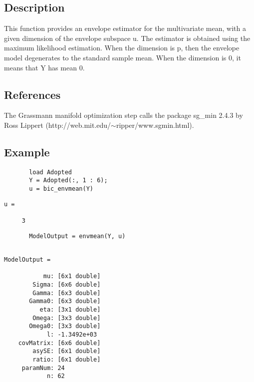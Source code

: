 \documentclass[a4paper,11pt,openany]{memoir}
\begin{document}
\subsection*{Description}

\begin{par}
This function provides an envelope estimator for the multivariate mean, with a given dimension of the envelope subspace u. The estimator is obtained using the maximum likelihood estimation.  When the dimension is p, then the envelope model degenerates to the standard sample mean.  When the dimension is 0, it means that Y has mean 0.
\end{par} \vspace{1em}



\subsection*{References}

\begin{par}
The Grassmann manifold optimization step calls the package sg\_min 2.4.3 by Ross Lippert (http://web.mit.edu/$\sim$ripper/www.sgmin.html).
\end{par} \vspace{1em}


\subsection*{Example}


\begin{verbatim}       load Adopted
       Y = Adopted(:, 1 : 6);
       u = bic_envmean(Y)\end{verbatim}
    
        \color{lightgray} \ttfamily\begin{verbatim}
u =

     3
\end{verbatim} \rmfamily
\color{black}

\begin{verbatim}       ModelOutput = envmean(Y, u)\end{verbatim}

        \color{lightgray} \ttfamily\begin{verbatim}

ModelOutput = 

           mu: [6x1 double]
        Sigma: [6x6 double]
        Gamma: [6x3 double]
       Gamma0: [6x3 double]
          eta: [3x1 double]
        Omega: [3x3 double]
       Omega0: [3x3 double]
            l: -1.3492e+03
    covMatrix: [6x6 double]
        asySE: [6x1 double]
        ratio: [6x1 double]
     paramNum: 24
            n: 62
\end{verbatim} \rmfamily
\color{black}
\end{document}
